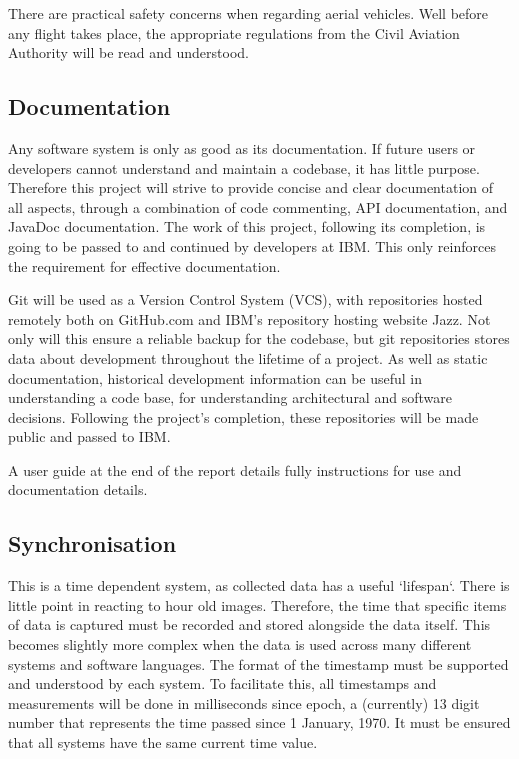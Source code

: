 \documentclass{article}
\begin{document}
There are practical safety concerns when regarding aerial vehicles. Well before any flight takes place, the appropriate regulations from the Civil Aviation Authority will be read and understood.

\subsection{Documentation}
Any software system is only as good as its documentation. If future users or developers cannot understand and maintain a codebase, it has little purpose. Therefore this project will strive to provide concise and clear documentation of all aspects, through a combination of code commenting, API documentation, and JavaDoc documentation. The work of this project, following its completion, is going to be passed to and continued by developers at IBM. This only reinforces the requirement for effective documentation.

Git will be used as a Version Control System (VCS), with repositories hosted remotely both on GitHub.com and IBM's repository hosting website Jazz\cite{jazz}. Not only will this ensure a reliable backup for the codebase, but git repositories stores data about development throughout the lifetime of a project. As well as static documentation, historical development information can be useful in understanding a code base, for understanding architectural and software decisions\cite{crimeScene}. Following the project's completion, these repositories will be made public and passed to IBM.

A user guide at the end of the report details fully instructions for use and documentation details.

\subsection{Synchronisation}
This is a time dependent system, as collected data has a useful `lifespan`. There is little point in reacting to hour old images. Therefore, the time that specific items of data is captured must be recorded and stored alongside the data itself. This becomes slightly more complex when the data is used across many different systems and software languages. The format of the timestamp must be supported and understood by each system. To facilitate this, all timestamps and measurements will be done in milliseconds since epoch, a (currently) 13 digit number that represents the time passed since 1 January, 1970. It must be ensured that all systems have the same current time value.
\end{document}
